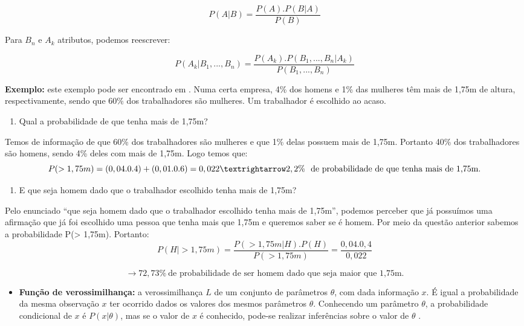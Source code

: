 \documentclass[
]{book}
\providecommand{\tightlist}{%
  \setlength{\itemsep}{0pt}\setlength{\parskip}{0pt}}
\begin{document}
\begin{equation} 
 P(A|B) = \frac{P(A).P(B|A)}{P(B)}
  \label{eq:bayes}
\end{equation}

Para \(B_n\) e \(A_k\) atributos, podemos reescrever:

\begin{equation} 
 P(A_k|B_1,...,B_n) = \frac{P(A_k).P(B_1,...,B_n|A_k)}{P(B_1,...,B_n)}
  \label{eq:bayesn}
\end{equation}

\textbf{Exemplo:} este exemplo pode ser encontrado em \citet{freund2009estatistica}. Numa certa empresa, 4\% dos homens e 1\% das mulheres têm mais de 1,75m
de altura, respectivamente, sendo que 60\% dos trabalhadores são mulheres. Um trabalhador é escolhido ao acaso.

\begin{enumerate}
\def\labelenumi{\arabic{enumi}.}
\tightlist
\item
  Qual a probabilidade de que tenha mais de 1,75m?
\end{enumerate}

Temos de informação de que 60\% dos trabalhadores são mulheres e que 1\% delas possuem mais de 1,75m. Portanto 40\% dos trabalhadores são homens, sendo 4\% deles com mais de 1,75m. Logo temos que:
\[P(> 1, 75m) = (0, 04 . 0.4) + (0, 01 . 0.6) = 0, 022 \\ → 2, 2\% \ \mbox{ de probabilidade de que tenha mais de 1,75m.}\]

\begin{enumerate}
\def\labelenumi{\arabic{enumi}.}
\setcounter{enumi}{1}
\tightlist
\item
  E que seja homem dado que o trabalhador escolhido tenha mais de 1,75m?
\end{enumerate}

Pelo enunciado ``que seja homem dado que o trabalhador escolhido tenha mais de 1,75m'', podemos perceber que já possuímos uma afirmação que já foi escolhido uma pessoa que tenha mais que 1,75m e queremos saber se é homem. Por meio da questão anterior sabemos a probabilidade P(\textgreater{} 1,75m). Portanto:
\[P(H| > 1, 75m) = \frac{P(> 1, 75m|H).P(H)}{P(> 1, 75m)}=\frac{0,04.0,4}{0, 022} \]

\[→ 72,73\% \ \mbox{de probabilidade de ser homem dado que seja maior que 1,75m.}\]

\begin{itemize}
\tightlist
\item
  \textbf{Função de verossimilhança:} a verossimilhança \(L\) de um conjunto de parâmetros \(\theta\), com dada informação \(x\). É igual a probabilidade da mesma observação \(x\) ter ocorrido dados os valores dos mesmos parâmetros \(\theta\). Conhecendo um parâmetro \(\theta\), a probabilidade condicional de \(x\) é \(P(x|\theta)\), mas se o valor de \(x\) é conhecido, pode-se realizar inferências sobre o valor de \(\theta\) \citep{bolfarine2001introduccao}.
\end{itemize}
\end{document}
